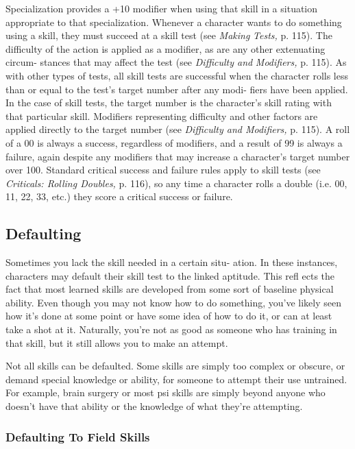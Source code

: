 Specialization provides a +10 modifier when using 
that skill in a situation appropriate to that specialization.
Whenever a character wants to do something using 
a skill, they must succeed at a skill test (see \textit{Making }
\textit{Tests,} p. 115). The difficulty of the action is applied 
as a modifier, as are any other extenuating circum-
stances that may affect the test (see \textit{Difficulty  and }
\textit{Modifiers,} p. 115). As with other types of tests, all skill 
tests are successful when the character rolls less than 
or equal to the test's target number after any modi-
fiers have been applied. In the case of skill tests, the 
target number is the character's skill rating with that 
particular skill. Modifiers representing difficulty and 
other factors are applied directly to the target number 
(see \textit{Difficulty and Modifiers,} p. 115). A roll of a 00 is 
always a success, regardless of modifiers, and a result 
of 99 is always a failure, again despite any modifiers 
that may increase a character's target number over 
100. Standard critical success and failure rules apply 
to skill tests (see \textit{Criticals: Rolling Doubles,} p. 116), 
so any time a character rolls a double (i.e. 00, 11, 22, 
33, etc.) they score a critical success or failure.

\subsection{Defaulting}

Sometimes you lack the skill needed in a certain situ-
ation. In these instances, characters may default their 
skill test to the linked aptitude. This refl ects the fact 
that most learned skills are developed from some sort 
of baseline physical ability. Even though you may not 
know how to do something, you've likely seen how 
it's done at some point or have some idea of how to 
do it, or can at least take a shot at it. Naturally, you're 
not as good as someone who has training in that skill, 
but it still allows you to make an attempt.

Not all skills can be defaulted. Some skills are 
simply too complex or obscure, or demand special 
knowledge or ability, for someone to attempt their 
use untrained. For example, brain surgery or most psi 
skills are simply beyond anyone who doesn't have that 
ability or the knowledge of what they're attempting.

\subsubsection{Defaulting To Field Skills}

